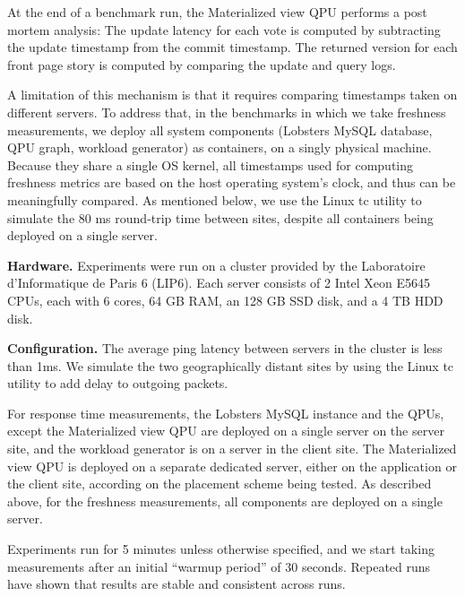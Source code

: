At the end of a benchmark run, the Materialized view QPU performs a post mortem analysis:
The update latency for each vote is computed by subtracting the update timestamp from the commit timestamp.
The returned version for each front page story is computed by comparing the update and query logs.

A limitation of this mechanism is that it requires comparing timestamps taken on different servers.
To address that, in the benchmarks in which we take freshness measurements,
we deploy all system components (Lobsters MySQL database, QPU graph, workload generator) as containers,
on a singly physical machine.
Because they share a single OS kernel, all timestamps used for computing freshness metrics are based
on the host operating system's clock, and thus can be meaningfully compared.
As mentioned below, we use the Linux tc utility \cite{tc} to simulate the 80 ms round-trip time between sites,
despite all containers being deployed on a single server.

\bigskip
\noindent
\textbf{Hardware.}
Experiments were run on a cluster provided by the Laboratoire d'Informatique de Paris 6 (LIP6).
Each server consists of 2 Intel Xeon E5645 CPUs, each with 6 cores, 64 GB RAM, an 128 GB SSD disk, and a 4 TB HDD disk.

\bigskip
\noindent
\textbf{Configuration.}
The average ping latency between servers in the cluster is less than 1ms.
We simulate the two geographically distant sites by using the Linux tc utility \cite{tc} to add delay to outgoing packets.

For response time measurements, the Lobsters MySQL instance and the QPUs, except the Materialized view QPU are deployed
on a single server on the server site, and the workload generator is on a server in the client site.
The Materialized view QPU is deployed on a separate dedicated server, either on the application or the client site,
according on the placement scheme being tested.
As described above, for the freshness measurements, all components are deployed on a single server.

Experiments run for 5 minutes unless otherwise specified, and we start taking measurements after an initial
``warmup period'' of 30 seconds.
Repeated runs have shown that results are stable and consistent across runs.



